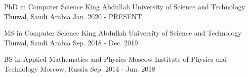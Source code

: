 


\begin{cventries}


\cventry
{PhD in Computer Science } %
{King Abdullah University of Science and Technology} %
{Thuwal, Saudi Arabia} %
{Jan. 2020 - PRESENT} %
{
}

\cventry
{MS in Computer Science } %
{King Abdullah University of Science and Technology} %
{Thuwal, Saudi Arabia} %
{Sep. 2018 - Dec. 2019} %
{
}

\cventry
{BS in Applied Mathematics and Physics} %
{Moscow Institute of Physics and Technology} %
{Moscow, Russia} %
{Sep. 2014 - Jun. 2018} %
{ %
}


\end{cventries}